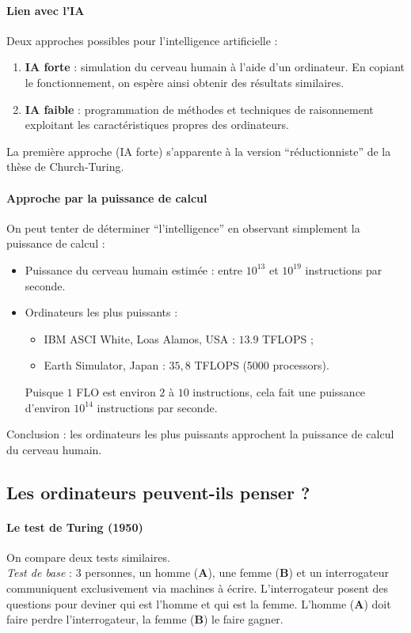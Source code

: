 \paragraph{Lien avec l'IA}
Deux approches possibles pour l'intelligence artificielle :
\begin{enumerate}
	\item \textbf{IA forte} : simulation du cerveau humain à l'aide d'un ordinateur. En copiant le fonctionnement, on espère ainsi obtenir des résultats similaires.
	\item \textbf{IA faible} : programmation de méthodes et techniques de raisonnement exploitant les caractéristiques propres des ordinateurs.
\end{enumerate}
La première approche (IA forte) s'apparente à la version ``réductionniste'' de la thèse de Church-Turing.

\paragraph{Approche par la puissance de calcul}
On peut tenter de déterminer ``l'intelligence'' en observant simplement la puissance de calcul :
\begin{itemize}
	\item Puissance du cerveau humain estimée : entre $10^{13}$ et $10^{19}$ instructions par seconde.
	\item Ordinateurs les plus puissants :
	\begin{itemize}
	\item IBM ASCI White, Loas Alamos, USA : $13.9$ TFLOPS ;
	\item Earth Simulator, Japan : $35,8$ TFLOPS (5000 processors).
\end{itemize}
Puisque $1$ FLO est environ $2$ à $10$ instructions, cela fait une puissance d'environ $10^{14}$ instructions par seconde.
\end{itemize}
Conclusion : les ordinateurs les plus puissants approchent la puissance de calcul du cerveau humain.
\subsection{Les ordinateurs peuvent-ils penser ?}
\paragraph{Le test de Turing (1950)}
On compare deux tests similaires.\\

\emph{Test de base} : 3 personnes, un homme (\textbf{A}), une femme (\textbf{B}) et un interrogateur communiquent exclusivement via machines à écrire. L'interrogateur posent des questions pour deviner qui est l'homme et qui est la femme. L'homme (\textbf{A}) doit faire perdre l'interrogateur, la femme (\textbf{B}) le faire gagner.\\

